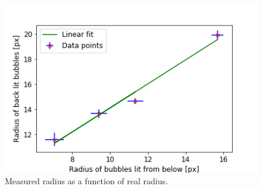 			\begin{figure}
				\centering
				\includegraphics[scale=.6]{graphs/radius_calibration_result.png}
				\caption{Measured radius as a function of real radius.}
				\label{fig:radius_calib_result}
			\end{figure}
			
			
			
			
			
































